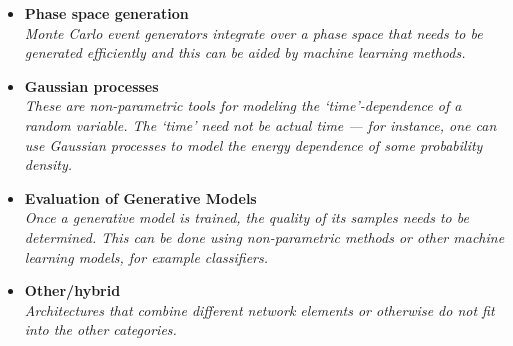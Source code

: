 \documentclass[12pt,letterpaper]{article}
\begin{document}
\begin{itemize}
\begin{itemize}
		\item \textbf{Phase space generation}~\cite{Bothmann:2026dar,Bogorad:2026oxa,DeCrescenzo:2026tsp,Heimel:2026hgp,Roch:2025jpu,Pyretzidis:2025stx,Bothmann:2025lwg,Searle:2025cnj,Janssen:2025zke,deSouza:2025bpl,Oh:2025fpq,Nachman:2025lid,Baruah:2025nby,Diaz:2024sxg,Ban:2024bqy,Kofler:2024efb,Deutschmann:2024lml,Calisto:2023vmm,Singh:2023yvj,Renteria-Estrada:2023buo,Heimel:2022wyj,Jinno:2022sbr,Maitre:2022xle,Yoon:2020zmb,Danziger:2021eeg,Backes:2020vka,Verheyen:2020bjw,Chen:2020nfb,Nachman:2020fff,Carrazza:2020rdn,Klimek:2018mza,Gao:2020vdv,Gao:2020zvv,Bothmann:2020ywa,Bendavid:2017zhk}
		\\\textit{Monte Carlo event generators integrate over a phase space that needs to be generated efficiently and this can be aided by machine learning methods.}
		\item \textbf{Gaussian processes}~\cite{Cisbani:2019xta,1804325,Bertone:2016mdy,Frate:2017mai}
                  \\\textit{These are non-parametric tools for modeling the `time'-dependence of a random variable.  The `time' need not be actual time --- for instance, one can use Gaussian processes to model the energy dependence of some probability density.}
                \item \textbf{Evaluation of Generative Models}~\cite{Robledo:2026yfd,Pang:2025lbs,Cappelli:2025myc,Grossi:2025pmm,Krause:2024avx,Grossi:2024axb,Ahmad:2024dql,Gavranovic:2023oam,Das:2023ktd,Kansal:2022spb,Krause:2021ilc}
                  \\\textit{Once a generative model is trained, the quality of its samples needs to be determined. This can be done using non-parametric methods or other machine learning models, for example classifiers.}
		\item \textbf{Other/hybrid}~\cite{Lo:2026use,Rajendram:2026rdp,Sahu:2023uwb,Santos:2023mib,Kronheim:2023jrl,Butter:2023fov,Kansal:2022spb,Li:2022jon,DiBello:2022rss,Cresswell:2022tof}
		\\\textit{Architectures that combine different network elements or otherwise do not fit into the other categories.}
	\end{itemize}

\end{itemize}
\end{document}
